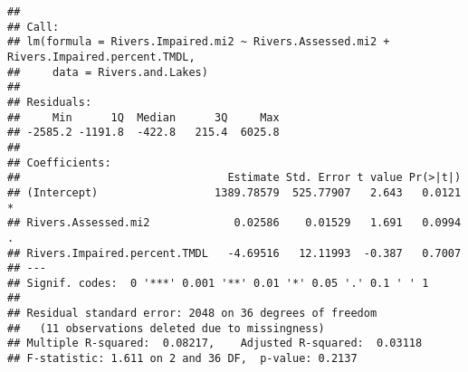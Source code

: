 \documentclass[]{article}
\newenvironment{Shaded}{\begin{snugshade}}{\end{snugshade}}
\newcommand{\CommentTok}[1]{\textcolor[rgb]{0.56,0.35,0.01}{\textit{#1}}}
\newcommand{\DataTypeTok}[1]{\textcolor[rgb]{0.13,0.29,0.53}{#1}}
\newcommand{\DecValTok}[1]{\textcolor[rgb]{0.00,0.00,0.81}{#1}}
\newcommand{\FloatTok}[1]{\textcolor[rgb]{0.00,0.00,0.81}{#1}}
\newcommand{\KeywordTok}[1]{\textcolor[rgb]{0.13,0.29,0.53}{\textbf{#1}}}
\newcommand{\NormalTok}[1]{#1}
\newcommand{\OperatorTok}[1]{\textcolor[rgb]{0.81,0.36,0.00}{\textbf{#1}}}
\newcommand{\StringTok}[1]{\textcolor[rgb]{0.31,0.60,0.02}{#1}}
\begin{document}
\begin{verbatim}
## 
## Call:
## lm(formula = Rivers.Impaired.mi2 ~ Rivers.Assessed.mi2 + Rivers.Impaired.percent.TMDL, 
##     data = Rivers.and.Lakes)
## 
## Residuals:
##     Min      1Q  Median      3Q     Max 
## -2585.2 -1191.8  -422.8   215.4  6025.8 
## 
## Coefficients:
##                                Estimate Std. Error t value Pr(>|t|)  
## (Intercept)                  1389.78579  525.77907   2.643   0.0121 *
## Rivers.Assessed.mi2             0.02586    0.01529   1.691   0.0994 .
## Rivers.Impaired.percent.TMDL   -4.69516   12.11993  -0.387   0.7007  
## ---
## Signif. codes:  0 '***' 0.001 '**' 0.01 '*' 0.05 '.' 0.1 ' ' 1
## 
## Residual standard error: 2048 on 36 degrees of freedom
##   (11 observations deleted due to missingness)
## Multiple R-squared:  0.08217,    Adjusted R-squared:  0.03118 
## F-statistic: 1.611 on 2 and 36 DF,  p-value: 0.2137
\end{verbatim}

\begin{Shaded}
\end{Shaded}
\end{document}
